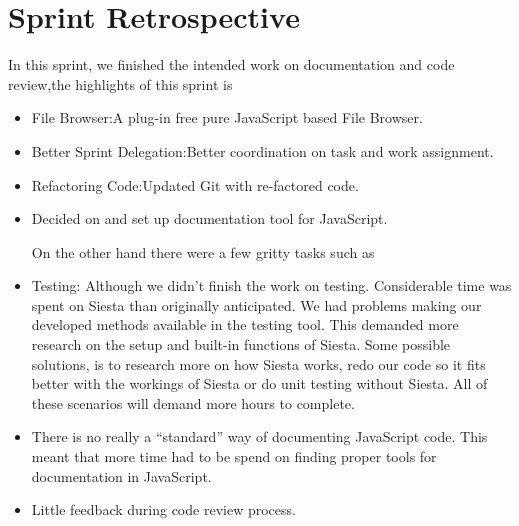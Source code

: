 \section{Sprint Retrospective} %
\label{sec:Sprint Retrospective}

In this sprint, we finished the intended work on documentation and code review,the highlights of this sprint is

\begin{itemize}
\item File Browser:A plug-in free pure JavaScript based File Browser.

\item Better Sprint Delegation:Better coordination on task and work assignment.

\item Refactoring Code:Updated Git with re-factored code.

\item Decided on and set up documentation tool for JavaScript.

On the other hand there were a few gritty tasks such as

\item Testing: Although we didn't finish the work on testing. Considerable time was spent on Siesta than originally anticipated. 
	 We had problems making our developed methods available in the testing tool. This demanded more research on the setup and built-in functions of Siesta. Some possible solutions, is to research more on how Siesta works, redo our code so it 
	 fits better with the workings of Siesta or do unit testing without Siesta. All of these scenarios will demand more hours to complete.

\item There is no really a ``standard'' way of documenting JavaScript code. This meant that more time had to be spend on finding proper tools for documentation in JavaScript.

\item Little feedback during code review process.

\end{itemize}
